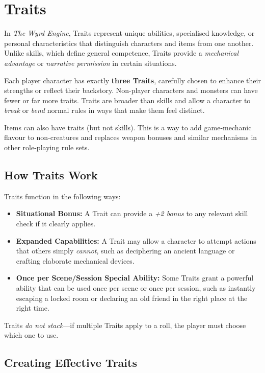 \section{Traits}

In \emph{The Wyrd Engine}, Traits represent unique abilities, specialised knowledge, or personal characteristics that distinguish characters and items from one another. Unlike skills, which define general competence, Traits provide a \emph{mechanical advantage} or \emph{narrative permission} in certain situations.

Each player character has exactly \textbf{three Traits}, carefully chosen to enhance their strengths or reflect their backstory. Non-player characters and monsters can have fewer or far more traits. Traits are broader than skills and allow a character to \emph{break} or \emph{bend} normal rules in ways that make them feel distinct.

Items can also have traits (but not skills). This is a way to add game-mechanic flavour to non-creatures and replaces weapon bonuses and similar mechanisms in other role-playing rule sets.

\subsection{How Traits Work}

Traits function in the following ways:

\begin{itemize}
    \item \textbf{Situational Bonus:} A Trait can provide a \emph{+2 bonus} to any relevant skill check if it clearly applies.
    \item \textbf{Expanded Capabilities:} A Trait may allow a character to attempt actions that others simply \emph{cannot}, such as deciphering an ancient language or crafting elaborate mechanical devices.
    \item \textbf{Once per Scene/Session Special Ability:} Some Traits grant a powerful ability that can be used once per scene or once per session, such as instantly escaping a locked room or declaring an old friend in the right place at the right time.
\end{itemize}

Traits \emph{do not stack}—if multiple Traits apply to a roll, the player must choose which one to use.

\subsection{Creating Effective Traits}

